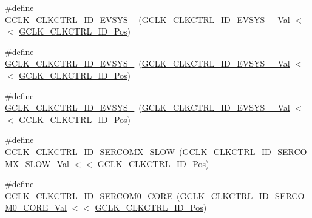 \begin{DoxyCompactItemize}
\item 
\#define \mbox{\hyperlink{group___s_a_m_d21___g_c_l_k_ga4ede600281c007318b45ec1e089261c9}{G\+C\+L\+K\+\_\+\+C\+L\+K\+C\+T\+R\+L\+\_\+\+I\+D\+\_\+\+E\+V\+S\+Y\+S\+\_}}~(\mbox{\hyperlink{group___s_a_m_d21___g_c_l_k_gaa16d3052520645978635ac4c5cf7cae6}{G\+C\+L\+K\+\_\+\+C\+L\+K\+C\+T\+R\+L\+\_\+\+I\+D\+\_\+\+E\+V\+S\+Y\+S\+\_\+\_\+\+Val}}   $<$$<$ \mbox{\hyperlink{group___s_a_m_d21___g_c_l_k_ga882860b306b819b8bb342bebd55c23aa}{G\+C\+L\+K\+\_\+\+C\+L\+K\+C\+T\+R\+L\+\_\+\+I\+D\+\_\+\+Pos}})
\item 
\#define \mbox{\hyperlink{group___s_a_m_d21___g_c_l_k_ga1b7252db50ef7df848058c9260c5d0b6}{G\+C\+L\+K\+\_\+\+C\+L\+K\+C\+T\+R\+L\+\_\+\+I\+D\+\_\+\+E\+V\+S\+Y\+S\+\_}}~(\mbox{\hyperlink{group___s_a_m_d21___g_c_l_k_ga4a5dad9a02f829080ec0d0c07e0f44a5}{G\+C\+L\+K\+\_\+\+C\+L\+K\+C\+T\+R\+L\+\_\+\+I\+D\+\_\+\+E\+V\+S\+Y\+S\+\_\+\_\+\+Val}}  $<$$<$ \mbox{\hyperlink{group___s_a_m_d21___g_c_l_k_ga882860b306b819b8bb342bebd55c23aa}{G\+C\+L\+K\+\_\+\+C\+L\+K\+C\+T\+R\+L\+\_\+\+I\+D\+\_\+\+Pos}})
\item 
\#define \mbox{\hyperlink{group___s_a_m_d21___g_c_l_k_ga01be2101b081be2ba462c3f0ba75b8b5}{G\+C\+L\+K\+\_\+\+C\+L\+K\+C\+T\+R\+L\+\_\+\+I\+D\+\_\+\+E\+V\+S\+Y\+S\+\_}}~(\mbox{\hyperlink{group___s_a_m_d21___g_c_l_k_gae046a3b63da8327bfa71268d66b516eb}{G\+C\+L\+K\+\_\+\+C\+L\+K\+C\+T\+R\+L\+\_\+\+I\+D\+\_\+\+E\+V\+S\+Y\+S\+\_\+\_\+\+Val}}  $<$$<$ \mbox{\hyperlink{group___s_a_m_d21___g_c_l_k_ga882860b306b819b8bb342bebd55c23aa}{G\+C\+L\+K\+\_\+\+C\+L\+K\+C\+T\+R\+L\+\_\+\+I\+D\+\_\+\+Pos}})
\item 
\#define \mbox{\hyperlink{group___s_a_m_d21___g_c_l_k_ga7279413efcc5ac32980861d9429c706c}{G\+C\+L\+K\+\_\+\+C\+L\+K\+C\+T\+R\+L\+\_\+\+I\+D\+\_\+\+S\+E\+R\+C\+O\+M\+X\+\_\+\+S\+L\+OW}}~(\mbox{\hyperlink{group___s_a_m_d21___g_c_l_k_ga153a5b6024c662b8f816b368ccd1bdc6}{G\+C\+L\+K\+\_\+\+C\+L\+K\+C\+T\+R\+L\+\_\+\+I\+D\+\_\+\+S\+E\+R\+C\+O\+M\+X\+\_\+\+S\+L\+O\+W\+\_\+\+Val}} $<$$<$ \mbox{\hyperlink{group___s_a_m_d21___g_c_l_k_ga882860b306b819b8bb342bebd55c23aa}{G\+C\+L\+K\+\_\+\+C\+L\+K\+C\+T\+R\+L\+\_\+\+I\+D\+\_\+\+Pos}})
\item 
\#define \mbox{\hyperlink{group___s_a_m_d21___g_c_l_k_ga86630fdf442f4facc7163cb9aa75f9d1}{G\+C\+L\+K\+\_\+\+C\+L\+K\+C\+T\+R\+L\+\_\+\+I\+D\+\_\+\+S\+E\+R\+C\+O\+M0\+\_\+\+C\+O\+RE}}~(\mbox{\hyperlink{group___s_a_m_d21___g_c_l_k_gaa73a1f52ac12d73c9b415d0cf7c129d8}{G\+C\+L\+K\+\_\+\+C\+L\+K\+C\+T\+R\+L\+\_\+\+I\+D\+\_\+\+S\+E\+R\+C\+O\+M0\+\_\+\+C\+O\+R\+E\+\_\+\+Val}} $<$$<$ \mbox{\hyperlink{group___s_a_m_d21___g_c_l_k_ga882860b306b819b8bb342bebd55c23aa}{G\+C\+L\+K\+\_\+\+C\+L\+K\+C\+T\+R\+L\+\_\+\+I\+D\+\_\+\+Pos}})
$$
\end{DoxyCompactItemize}
